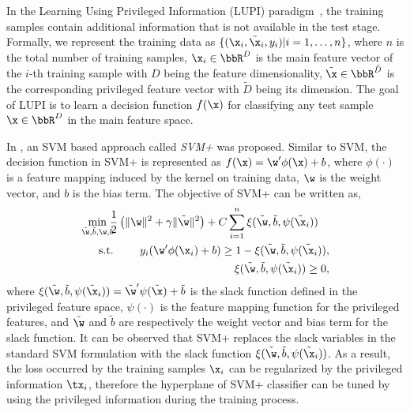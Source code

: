 In the Learning Using Privileged Information (LUPI)
paradigm~\cite{SVMplus_vapnik}, the training samples contain
additional information that is not available in the test
stage. Formally, we represent the training data as $\{(\x_i,
\tilde{\x}_i, y_i)|i = 1, \ldots, n\}$, where $n$ is the total number
of training samples, $\x_i \in \bbR^D$ is the main feature vector of
the $i$-th training sample with $D$ being the feature dimensionality,
$\tilde{\x} \in \bbR^{\tilde{D}}$ is the corresponding privileged
feature vector with $\tilde{D}$ being its dimension. The goal of LUPI
is to learn a decision function $f(\x)$ for classifying any test
sample $\x \in \bbR^D$ in the main feature space.

In \cite{SVMplus_vapnik}, an SVM based approach called \emph{SVM+} was proposed. Similar to SVM, the decision function in SVM+ is represented as $f(\x) = \w'\phi(\x) + b$, where $\phi(\cdot)$ is a feature mapping induced by the kernel on training data, $\w$ is the weight vector, and $b$ is the bias term. The objective of SVM+ can be written as,
\begin{eqnarray}
\min_{\tilde{\w}, \tilde{b}, \w, b}\!\!\!\!&&\!\!\!\!\frac{1}{2}\left(\|\w\|^2 + \gamma\|\tilde{\w}\|^2\right)+ C\sum_{i=1}^{n}\xi(\tilde{\w}, \tilde{b}, \psi(\tilde{\x}_i))\quad\label{eqn:PL}\\
\mbox{s.t.}\!\!\!\!&&\!\!\!\!y_i(\w'\phi(\x_i) + b) \geq 1 - \xi(\tilde{\w}, \tilde{b}, \psi(\tilde{\x}_i)),\label{eqn:PL_cons1}\\
\!\!\!\!&&\!\!\!\!\xi(\tilde{\w}, \tilde{b}, \psi(\tilde{\x}_i)) \geq 0,\label{eqn:PL_cons2}
\end{eqnarray}
where $\xi(\tilde{\w}, \tilde{b}, \psi(\tilde{\x}_i)) = \tilde{\w}'\psi(\tilde{\x})+\tilde{b}$ is the slack function defined in the privileged feature space, $\psi(\cdot)$ is the feature mapping function for the privileged features, and $\tilde{\w}$ and $\tilde{b}$ are respectively the weight vector and bias term for the slack function. It can be observed that SVM+ replaces the slack variables in the standard SVM formulation with the slack function $\xi(\tilde{\w}, \tilde{b}, \psi(\tilde{\x}_i))$. As a result, the loss occurred by the training samples $\x_i$ can be regularized by the privileged information $\tx_i$, therefore the hyperplane of SVM+ classifier can be tuned by using the privileged information during the training process.

